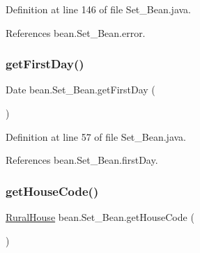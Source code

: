 Definition at line 146 of file Set\+\_\+\+Bean.\+java.


\begin{DoxyCode}{0}

\end{DoxyCode}


References bean.\+Set\+\_\+\+Bean.\+error.

\mbox{\label{classbean_1_1Set__Bean_a623256f1320812316c70b3b9bda4196c}} 
\subsubsection{\texorpdfstring{getFirstDay()}{getFirstDay()}}
{\footnotesize\ttfamily Date bean.\+Set\+\_\+\+Bean.\+get\+First\+Day (\begin{DoxyParamCaption}{ }\end{DoxyParamCaption})}



Definition at line 57 of file Set\+\_\+\+Bean.\+java.


\begin{DoxyCode}{0}

\end{DoxyCode}


References bean.\+Set\+\_\+\+Bean.\+first\+Day.

\mbox{\label{classbean_1_1Set__Bean_a317933af35c5e82b4ee1dd1883376773}} 
\subsubsection{\texorpdfstring{getHouseCode()}{getHouseCode()}}
{\footnotesize\ttfamily \mbox{\hyperlink{classdomain_1_1RuralHouse}{Rural\+House}} bean.\+Set\+\_\+\+Bean.\+get\+House\+Code (\begin{DoxyParamCaption}{ }\end{DoxyParamCaption})}



